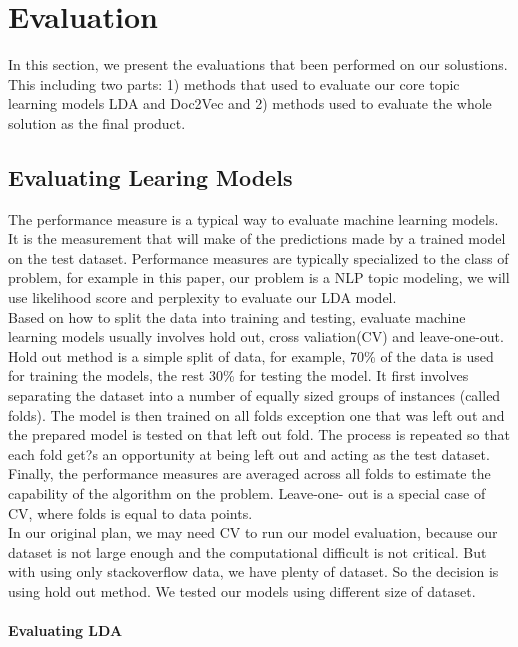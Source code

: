 
\section{Evaluation}
In this section, we present the evaluations that been performed on our solustions. This including two parts: 1) methods that used to evaluate our core topic learning models LDA and Doc2Vec and 2) methods used to evaluate the whole solution as the final product. 
\subsection{Evaluating Learing Models}
The performance measure is a typical way to evaluate machine learning models. It is the measurement that will make of the predictions made by a trained model on the test dataset. Performance measures are typically specialized to the class of problem, for example in this paper, our problem is a NLP topic modeling, we will use likelihood score and perplexity to evaluate our LDA model.\\
Based on how to split the data into training and testing, evaluate machine learning models usually involves hold out, cross valiation(CV) and leave-one-out. \\
Hold out method is a simple split of data, for example, 70\% of the data is used for training the models, the rest 30\% for testing the model. It first involves separating the dataset into a number of equally sized groups of instances (called folds). The model is then trained on all folds exception one that was left out and the prepared model is tested on that left out fold. The process is repeated so that each fold get?s an opportunity at being left out and acting as the test dataset. Finally, the performance measures are averaged across all folds to estimate the capability of the algorithm on the problem.  Leave-one- out is a special case of CV, where folds is equal to data points.\\
In our original plan, we may need CV to run our model evaluation, because our dataset is not large enough and the computational difficult is not critical. But with using only stackoverflow data, we have plenty of dataset. So the decision is using hold out method. We tested our models using different size of dataset. 
 
\paragraph{Evaluating LDA}


